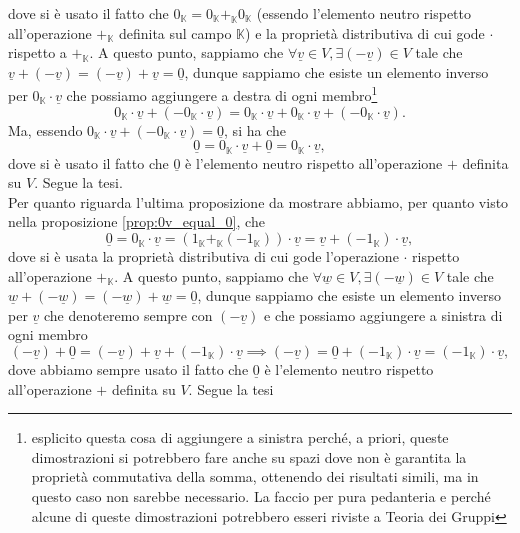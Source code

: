 dove si è usato il fatto che $0_\mathbb{K} = 0_\mathbb{K} +_{\mathbb{K}} 0_\mathbb{K}$ (essendo l'elemento neutro rispetto all'operazione $+_\mathbb{K}$ definita sul campo $\mathbb{K}$) e la proprietà distributiva di cui gode $\cdot$ rispetto a $+_\mathbb{K}$. A questo punto, sappiamo che $\forall \underline{v} \in V, \exists (-\underline{v}) \in V$ tale che $\underline{v} + (-\underline{v}) = (-\underline{v}) + \underline{v} = \underline{0}$, dunque sappiamo che esiste un elemento inverso per $0_{\mathbb{K}} \cdot \underline{v}$ che possiamo aggiungere a destra di ogni membro\footnote{esplicito questa cosa di aggiungere a sinistra perché, a priori, queste dimostrazioni si potrebbero fare anche su spazi dove non è garantita la proprietà commutativa della somma, ottenendo dei risultati simili, ma in questo caso non sarebbe necessario. La faccio per pura pedanteria e perché alcune di queste dimostrazioni potrebbero esseri riviste a Teoria dei Gruppi}
    $$
    0_\mathbb{K} \cdot \underline{v} + (-0_\mathbb{K} \cdot \underline{v}) = 0_\mathbb{K} \cdot \underline{v} + 0_\mathbb{K} \cdot \underline{v} + (-0_\mathbb{K} \cdot \underline{v}).
    $$
Ma, essendo $0_\mathbb{K} \cdot \underline{v} + (-0_\mathbb{K} \cdot \underline{v}) = \underline{0}$, si ha che
    $$
    \underline{0} = 0_\mathbb{K} \cdot \underline{v} + \underline{0} = 0_\mathbb{K} \cdot \underline{v},
    $$
dove si è usato il fatto che $\underline{0}$ è l'elemento neutro rispetto all'operazione $+$ definita su $V$. Segue la tesi. \\
Per quanto riguarda l'ultima proposizione da mostrare abbiamo, per quanto visto nella proposizione \ref{prop:0v_equal_0}, che
$$
    \underline{0} = 0_\mathbb{K} \cdot \underline{v} = (1_\mathbb{K} +_\mathbb{K} (-1_\mathbb{K})) \cdot \underline{v} = \underline{v} + (-1_\mathbb{K}) \cdot \underline{v},
$$
dove si è usata la proprietà distributiva di cui gode l'operazione $\cdot$ rispetto all'operazione $+_\mathbb{K}$. A questo punto, sappiamo che $\forall \underline{w} \in V, \exists (-\underline{w}) \in V$ tale che $\underline{w} + (-\underline{w}) = (-\underline{w}) + \underline{w} = \underline{0}$, dunque sappiamo che esiste un elemento inverso per $\underline{v}$ che denoteremo sempre con $(-\underline{v})$ e che possiamo aggiungere a sinistra di ogni membro
$$
    (- \underline{v}) + \underline{0} = (-\underline{v}) + \underline{v} + (-1_\mathbb{K}) \cdot \underline{v} \implies (-\underline{v}) = \underline{0} + (-1_\mathbb{K}) \cdot \underline{v} = (-1_\mathbb{K}) \cdot \underline{v},
$$
dove abbiamo sempre usato il fatto che $\underline{0}$ è l'elemento neutro rispetto all'operazione $+$ definita su $V$. Segue la tesi

